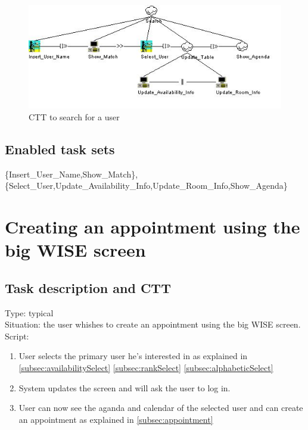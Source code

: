 \documentclass[11pt, a4paper,svglistings]{report}
\begin{document}
\begin{figure}[H]
\centering
    \includegraphics[width=1\textwidth]{Search_User.jpg}
  \caption[Search a user CTT]{\label{fig:SearchUser}CTT to search for a user}
\end{figure}

\subsection{Enabled task sets}

\{Insert\_User\_Name,Show\_Match\},\{Select\_User,Update\_Availability\_Info,Update\_Room\_Info,Show\_Agenda\}



\section{Creating an appointment using the big WISE screen}

\subsection{Task description and CTT}

Type: typical \\
Situation: the user whishes to create an appointment using the big WISE screen. \\
Script:
\begin{enumerate}
\item User selects the primary user he's interested in as explained in \ref{subsec:availabilitySelect} \ref{subsec:rankSelect} \ref{subsec:alphabeticSelect}
\item System updates the screen and will ask the user to log in.
\item User can now see the aganda and calendar of the selected user and can create an appointment as explained in \ref{subsec:appointment}
\end{enumerate}
\end{document}
